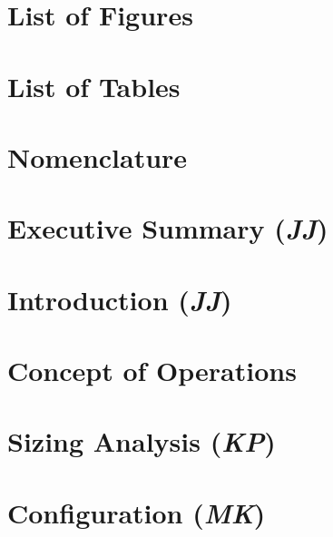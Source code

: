 \documentclass[conf]{new-aiaa}
\begin{document}
\newpage
\tableofcontents
\renewcommand{\thesection}{\arabic{section}}

\section{List of Figures}
\makeatletter
{}%
\makeatother

\section{List of Tables}
\makeatletter
{}%
\makeatother

\newpage


\section{Nomenclature}


\newpage
\doublespacing


\section{Executive Summary (\textit{JJ})}
\label{section: Exec Summary}


\clearpage
\setcounter{section}{0}
\renewcommand{\thesection}{\Roman{section}}

\section{Introduction (\textit{JJ})}
\label{section: Intro}


\section{Concept of Operations}
\label{section: Conops}


\clearpage
\section{Sizing Analysis (\textit{KP})}
\label{section: Sizing Analysis}


\section{Configuration (\textit{MK})}
\label{section: Configuration}

\end{document}
